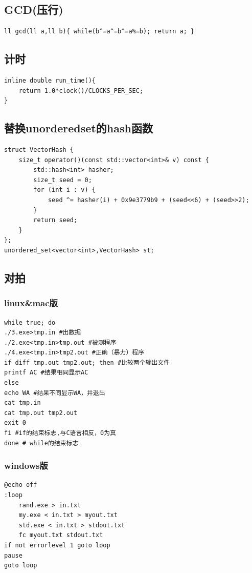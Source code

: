 \documentclass[a4]{ctexart}
\begin{document}
\subsection{GCD(压行)}
\begin{lstlisting}
ll gcd(ll a,ll b){ while(b^=a^=b^=a%=b); return a; }
\end{lstlisting}

\subsection{计时}
\begin{lstlisting}
inline double run_time(){
    return 1.0*clock()/CLOCKS_PER_SEC;
}
\end{lstlisting}


\subsection{替换unorderedset的hash函数}
\begin{lstlisting}
struct VectorHash {
    size_t operator()(const std::vector<int>& v) const {
        std::hash<int> hasher;
        size_t seed = 0;
        for (int i : v) {
            seed ^= hasher(i) + 0x9e3779b9 + (seed<<6) + (seed>>2);
        }
        return seed;
    }
};
unordered_set<vector<int>,VectorHash> st;
\end{lstlisting}
\newpage
\subsection{对拍}
\subsubsection{linux\&mac版}
\begin{lstlisting}
while true; do
./3.exe>tmp.in #出数据
./2.exe<tmp.in>tmp.out #被测程序
./4.exe<tmp.in>tmp2.out #正确（暴力）程序
if diff tmp.out tmp2.out; then #比较两个输出文件
printf AC #结果相同显示AC
else
echo WA #结果不同显示WA，并退出
cat tmp.in
cat tmp.out tmp2.out
exit 0
fi #if的结束标志,与C语言相反，0为真
done # while的结束标志
\end{lstlisting}
\subsubsection{windows版}
\begin{lstlisting}
@echo off  
:loop  
    rand.exe > in.txt
    my.exe < in.txt > myout.txt
    std.exe < in.txt > stdout.txt
    fc myout.txt stdout.txt
if not errorlevel 1 goto loop  
pause
goto loop
\end{lstlisting}
\end{document}

